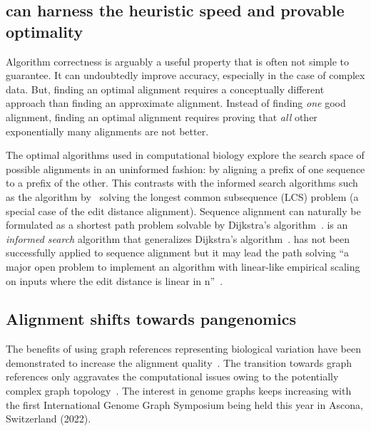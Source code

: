 \subsection*{\A can harness the heuristic speed and provable optimality}

Algorithm correctness is arguably a useful property that is often not simple to
guarantee. It can undoubtedly improve accuracy, especially in the case of
complex data. But, finding an optimal alignment requires a conceptually
different approach than finding an approximate alignment. Instead of finding
\emph{one} good alignment, finding an optimal alignment requires proving that
\emph{all} other exponentially many alignments are not better.

The optimal algorithms used in computational biology explore the search space of
possible alignments in an uninformed fashion: by aligning a prefix of one
sequence to a prefix of the other. This contrasts with the informed search
algorithms such as the algorithm by~\citet{hunt1977fast} solving the longest
common subsequence (LCS) problem (a special case of the edit distance
alignment). Sequence alignment can naturally be formulated as a shortest path
problem solvable by Dijkstra's algorithm~\citep{ukkonen1985algorithms}. \A is an
\emph{informed search} algorithm that generalizes Dijkstra's
algorithm~\citep{hart1968formal}. \A has not been successfully applied to
sequence alignment but it may lead the path solving ``a major open problem to
implement an algorithm with linear-like empirical scaling on inputs where the
edit distance is linear in n''~\citep{medvedev2022theoretical}.

\subsection*{Alignment shifts towards pangenomics}

The benefits of using graph references representing biological variation have
been demonstrated to increase the alignment
quality~\citep{garrison_variation_2018}. The transition towards graph references
only aggravates the computational issues owing to the potentially complex graph
topology~\citep{equi_complexity_2019}. The interest in genome graphs keeps
increasing with the first International Genome Graph Symposium being held this
year in Ascona, Switzerland (2022).

